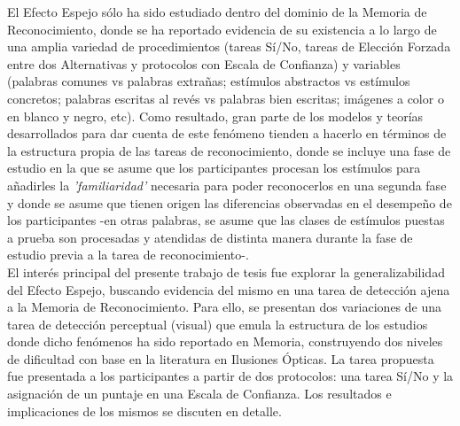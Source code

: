 El Efecto Espejo sólo ha sido estudiado dentro del dominio de la Memoria de Reconocimiento, donde se ha reportado evidencia de su existencia a lo largo de una amplia variedad de procedimientos (tareas Sí/No, tareas de Elección Forzada entre dos Alternativas y protocolos con Escala de Confianza) y variables (palabras comunes vs palabras extrañas; estímulos abstractos vs estímulos concretos; palabras escritas al revés vs palabras bien escritas; imágenes a color o en blanco y negro, etc). Como resultado, gran parte de los modelos y teorías desarrollados para dar cuenta de este fenómeno tienden a hacerlo en términos de la estructura propia de las tareas de reconocimiento, donde se incluye una fase de estudio en la que se asume que los participantes procesan los estímulos para añadirles la \textit{'familiaridad'} necesaria para poder reconocerlos en una segunda fase y donde se asume que tienen origen las diferencias observadas en el desempeño de los participantes -en otras palabras, se asume que las clases de estímulos puestas a prueba son procesadas y atendidas de distinta manera durante la fase de estudio previa a la tarea de reconocimiento-.\\

El interés principal del presente trabajo de tesis fue explorar la generalizabilidad del Efecto Espejo, buscando evidencia del mismo en una tarea de detección ajena a la Memoria de Reconocimiento. Para ello, se presentan dos variaciones de una tarea de detección perceptual (visual) que emula la estructura de los estudios donde dicho fenómenos ha sido reportado en Memoria, construyendo dos niveles de dificultad con base en la literatura en Ilusiones Ópticas. La tarea propuesta fue presentada a los participantes a partir de dos protocolos: una tarea Sí/No y la asignación de un puntaje en una Escala de Confianza. Los resultados e implicaciones de los mismos se discuten en detalle.\\